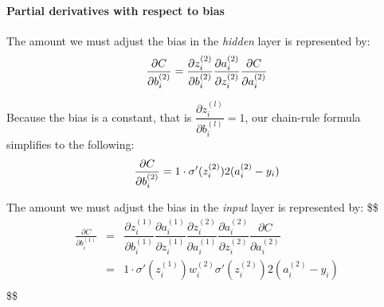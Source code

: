 \documentclass[
]{article}
\begin{document}
\hypertarget{partial-derivatives-with-respect-to-bias}{%
\paragraph{Partial derivatives with respect to
bias}\label{partial-derivatives-with-respect-to-bias}}

The amount we must adjust the bias in the \emph{hidden} layer is
represented by: \[
\frac{\partial{C}}{\partial{b_i^{(2)}}}  =  \dfrac{\partial{z_i^{(2)}}}{\partial{b_i^{(2)}}}
     \dfrac{\partial{a_i^{(2)}}}{\partial{z_i^{(2)}}}
     \dfrac{\partial{C}}{\partial{a_i^{(2)}}} \\
\]

Because the bias is a constant, that is
\(\dfrac{\partial{z_i^{(l)}}}{\partial{b_i^{(l)}}} = 1\), our chain-rule
formula simplifies to the following: \[
\frac{\partial{C}}{\partial{b_i^{(2)}}} = 1 \cdot \sigma'(z_i^{(2)}) 2(a_i^{(2)}-y_i) \\
\]

The amount we must adjust the bias in the \emph{input} layer is
represented by: \$\$ \begin{eqnarray}
\frac{\partial{C}}{\partial{b_i^{(1)}}}    &=& \dfrac{\partial{z_i^{(1)}}}{\partial{b_i^{(1)}}} \dfrac{\partial{a_i^{(1)}}}{\partial{z_i^{(1)}}}  \dfrac{\partial{z_i^{(2)}}}{\partial{a_i^{(1)}}}
     \dfrac{\partial{a_i^{(2)}}}{\partial{z_i^{(2)}}}
     \dfrac{\partial{C}}{\partial{a_i^{(2)}}} \\
     
&=& 1 \cdot \sigma'(z_i^{(1)}) w_i^{(2)} \sigma'(z_i^{(2)}) 2(a_i^{(2)}-y_i) \\

\end{eqnarray} \$\$
\end{document}
